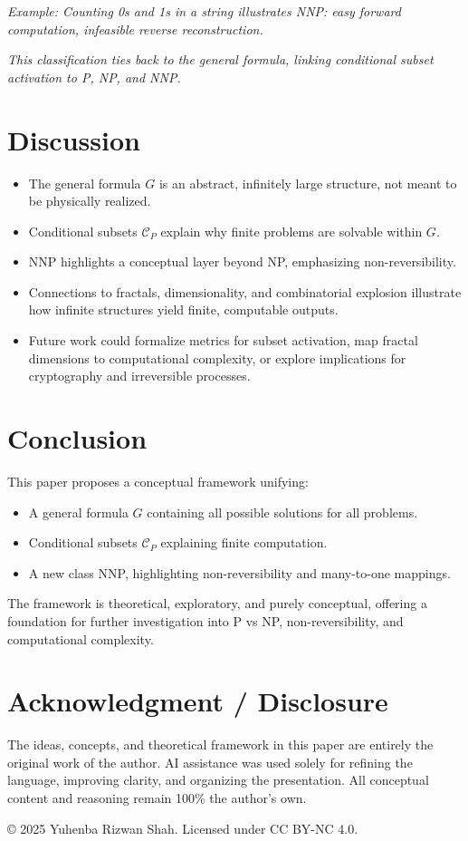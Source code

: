 \documentclass[12pt]{article}
\begin{document}
\textit{Example: Counting 0s and 1s in a string illustrates NNP: easy forward computation, infeasible reverse reconstruction.}

\textit{This classification ties back to the general formula, linking conditional subset activation to P, NP, and NNP.}

\newpage

\section{Discussion}

\begin{itemize}
    \item The general formula $G$ is an abstract, infinitely large structure, not meant to be physically realized.
    \item Conditional subsets $\mathcal{C}_P$ explain why finite problems are solvable within $G$.
    \item NNP highlights a conceptual layer beyond NP, emphasizing non-reversibility.
    \item Connections to fractals, dimensionality, and combinatorial explosion illustrate how infinite structures yield finite, computable outputs.
    \item Future work could formalize metrics for subset activation, map fractal dimensions to computational complexity, or explore implications for cryptography and irreversible processes.
\end{itemize}

\section{Conclusion}

This paper proposes a conceptual framework unifying:

\begin{itemize}
    \item A general formula $G$ containing all possible solutions for all problems.
    \item Conditional subsets $\mathcal{C}_P$ explaining finite computation.
    \item A new class NNP, highlighting non-reversibility and many-to-one mappings.
\end{itemize}

The framework is theoretical, exploratory, and purely conceptual, offering a foundation for further investigation into P vs NP, non-reversibility, and computational complexity.

 \section*{Acknowledgment / Disclosure}
The ideas, concepts, and theoretical framework in this paper are entirely the original work of the author. AI assistance was used solely for refining the language, improving clarity, and organizing the presentation. All conceptual content and reasoning remain 100\% the author's own.


\vfill
\begin{center}
\footnotesize © 2025 Yuhenba Rizwan Shah. Licensed under CC BY-NC 4.0.
\end{center}
\end{document}
